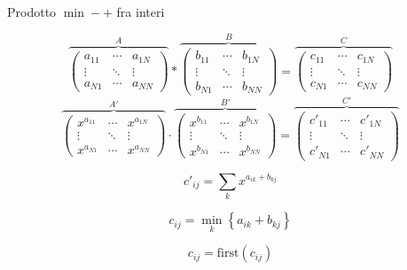 \documentclass{beamer}
\theoremstyle{plain}
\theoremstyle{definition}
\theoremstyle{remark}
\newcommand{\set}[1]{\left\{#1\right\}}
\newcommand{\pa}[1]{\left(#1\right)}
\begin{document}
\begin{frame}{Prodotto $\min - + $ fra interi}
\label{frame:prodottointeri}
  \begin{overprint}
    \begin{equation*}
      \overbrace{
        \begin{pmatrix}
          a_{11}  & \cdots & a_{1N} \\
          \vdots & \ddots & \vdots \\
          a_{N1} & \cdots & a_{NN} 
        \end{pmatrix}} ^{A} *
      \overbrace{
        \begin{pmatrix}
          b_{11}  & \cdots & b_{1N} \\
          \vdots & \ddots & \vdots \\
          b_{N1} & \cdots & b_{NN} 
        \end{pmatrix}} ^{B} =
      \overbrace{
        \begin{pmatrix}
          c_{11}  & \cdots & c_{1N} \\
          \vdots & \ddots & \vdots \\
          c_{N1} & \cdots & c_{NN} 
        \end{pmatrix}} ^{C}
    \end{equation*}
    \begin{equation*}
      \overbrace{
        \begin{pmatrix}
          x^{a_{11}}  & \cdots & x^{a_{1N}} \\
          \vdots & \ddots & \vdots \\
          x^{a_{N1}} & \cdots & x^{a_{NN}} 
        \end{pmatrix}} ^{A'} \cdot
      \overbrace{
        \begin{pmatrix}
          x^{b_{11}}  & \cdots & x^{b_{1N}} \\
          \vdots & \ddots & \vdots \\
          x^{b_{N1}} & \cdots & x^{b_{NN}} 
        \end{pmatrix}} ^{B'} =
      \overbrace{
      \begin{pmatrix}
        c'_{11}  & \cdots & c'_{1N} \\
        \vdots & \ddots & \vdots \\
        c'_{N1} & \cdots & c'_{NN} 
      \end{pmatrix}}^{C'}
    \end{equation*}
  \end{overprint}
  \begin{overprint}
     \[ c'_{ij} = \sum _k x^{a_{ik} + b_{kj}} \]
  \end{overprint}
  \[ c_{ij} = \min _k \set{ a_{ik} + b_{kj} } \]
  \begin{overprint}
     \[ c_{ij} = \mathrm{first}\pa{c_{ij}} \]
  \end{overprint}
\end{frame}
\end{document}
